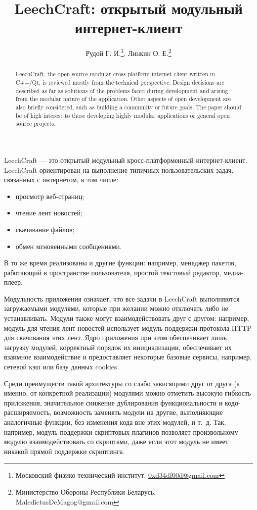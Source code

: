 \documentclass[10pt, a5paper]{article}
\begin{document}
\title{LeechCraft: открытый модульный интернет-клиент}

\author{Рудой Г. И.\footnote{Московский физико-технический институт, \url{0xd34df00d@gmail.com}}, Линкин О. Е.\footnote{Министерство Обороны Республики Беларусь, MaledictusDeMagog@gmail.com}}
\date{}
\maketitle

\begin{abstract}
LeechCraft, the open source modular
cross-platform internet client written in C++/Qt, is reviewed mostly from the
technical perspective. Design decisions are described as far as solutions of
the problems faced during development and arising from the modular
nature of the application. Other aspects of open development are also
briefly considered, such as building a community or future goals. 
The paper should be of high interest to those developing highly modular
applications or general open source projects.
\end{abstract}

LeechCraft --- это открытый модульный кросс-платформенный
интернет-клиент. LeechCraft ориентирован на выполнение типичных
пользовательских задач, связанных с интернетом, в том числе:
\begin{itemize}
	\item просмотр веб-страниц;
	\item чтение лент новостей;
	\item скачивание файлов;
	\item обмен мгновенными сообщениями. 
\end{itemize}
В то же время реализованы и другие функции: например, менеджер
пакетов, работающий в пространстве пользователя, простой текстовый
редактор, медиа-плеер.

Модульность приложения означает, что все задачи в LeechCraft
выполняются загружаемыми модулями, которые при желании можно отключать
либо не устанавливать. Модули также могут взаимодействовать друг с
другом: например, модуль для чтения лент новостей использует модуль
поддержки протокола HTTP для скачивания этих лент. Ядро приложения при
этом обеспечивает лишь загрузку модулей, корректный порядок их
инициализации, обеспечивает их взаимное взаимодействие и предоставляет
некоторые базовые сервисы, например, сетевой кэш или базу данных
cookies.

Среди преимуществ такой архитектуры со слабо зависящими друг от друга
(а именно, от конкретной реализации) модулями можно отметить высокую
гибкость приложения, значительное снижение дублирования
функциональности и кодо-расширяемость, возможность заменять модули на
другие, выполняющие аналогичные функции, без изменения кода вне этих
модулей, и т.~д. Так, например, модуль поддержки скриптовых плагинов
позволяет произвольному модулю взаимодействовать со скриптами, даже
если этот модуль не имеет никакой прямой поддержки скриптинга.
\end{document}
